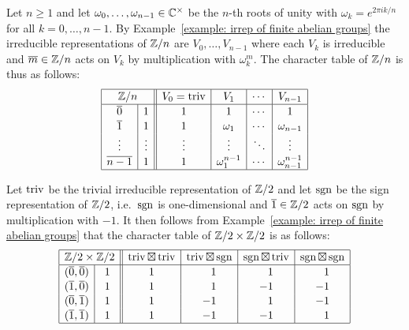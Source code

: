 \begin{example}
  Let $n \geq 1$ and let $\omega_0, \dotsc, \omega_{n-1} \in \mathbb{C}^\times$ be the $n$-th roots of unity with $\omega_k = e^{2 \pi i k / n}$ for all $k = 0, \dotsc, n-1$.
  By Example~\ref{example: irrep of finite abelian groups} the irreducible representations of $\mathbb{Z}/n$ are $V_0, \dotsc, V_{n-1}$ where each $V_k$ is irreducible and $\overline{m} \in \mathbb{Z}/n$ acts on $V_k$ by multiplication with $\omega_k^m$.
  The character table of $\mathbb{Z}/n$ is thus as follows:
  \[
    \begin{array}{|c|c||c|c|c|c|}
      \hline
        \multicolumn{2}{|c||}{\Integer/n}
      & V_0 = \triv
      & V_1
      & \cdots
      & V_{n-1}
      \\
      \hline
        \class{0}
      & 1
      & 1
      & 1
      & \cdots
      & 1
      \\
        \class{1}
      & 1
      & 1
      & \omega_1
      & \cdots
      & \omega_{n-1}
      \\
        \vdots
      & \vdots
      & \vdots
      & \vdots
      & \ddots
      & \vdots
      \\
        \class{n-1}
      & 1
      & 1
      & \omega_1 ^{n-1}
      & \cdots
      & \omega_{n-1}^{n-1}
      \\
      \hline
    \end{array}
  \]
\end{example}


\begin{example}
  Let $\operatorname{triv}$ be the trivial irreducible representation of $\mathbb{Z}/2$ and let $\operatorname{sgn}$ be the sign representation of $\mathbb{Z}/2$, i.e.\ $\operatorname{sgn}$ is one-dimensional and $\overline{1} \in \mathbb{Z}/2$ acts on $\operatorname{sgn}$ by multiplication with $-1$.
  It then follows from Example~\ref{example: irrep of finite abelian groups} that the character table of $\mathbb{Z}/2 \times \mathbb{Z}/2$ is as follows:
  \[
    \begingroup
    \renewcommand{\arraystretch}{1.1}
    \begin{array}{|c|c||c|c|c|c|}
      \hline
        \multicolumn{2}{|c||}{ \Integer/2 \times \Integer/2 }
      & \triv \outertensor \triv
      & \triv \outertensor \sgn
      & \sgn \outertensor \triv
      & \sgn \outertensor \sgn
      \\
      \hline
        (\class{0},\class{0})
      & 1
      &            1
      & \phantom{-}1
      & \phantom{-}1
      & \phantom{-}1
      \\
        (\class{1},\class{0})
      & 1
      &            1
      & \phantom{-}1
      &           -1
      &           -1
      \\
        (\class{0},\class{1})
      & 1
      &            1
      &           -1
      & \phantom{-}1
      &           -1
      \\
        (\class{1},\class{1})
      & 1
      &            1
      &           -1
      &           -1
      & \phantom{-}1
      \\
      \hline
    \end{array}
    \endgroup
  \]
\end{example}


